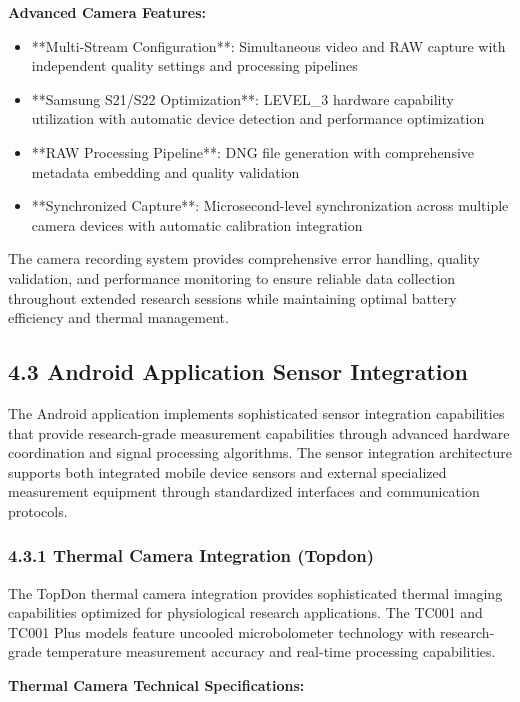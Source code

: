 \documentclass[12pt,a4paper]{article}
\begin{document}
\textbf{Advanced Camera Features:}

\begin{itemize}
\item **Multi-Stream Configuration**: Simultaneous video and RAW capture with independent quality settings and processing
  pipelines
\item **Samsung S21/S22 Optimization**: LEVEL_3 hardware capability utilization with automatic device detection and
  performance optimization
\item **RAW Processing Pipeline**: DNG file generation with comprehensive metadata embedding and quality validation
\item **Synchronized Capture**: Microsecond-level synchronization across multiple camera devices with automatic calibration
  integration

\end{itemize}
The camera recording system provides comprehensive error handling, quality validation, and performance monitoring to
ensure reliable data collection throughout extended research sessions while maintaining optimal battery efficiency and
thermal management.

\subsection{4.3 Android Application Sensor Integration}

The Android application implements sophisticated sensor integration capabilities that provide research-grade measurement
capabilities through advanced hardware coordination and signal processing algorithms. The sensor integration
architecture supports both integrated mobile device sensors and external specialized measurement equipment through
standardized interfaces and communication protocols.

\subsubsection{4.3.1 Thermal Camera Integration (Topdon)}

The TopDon thermal camera integration provides sophisticated thermal imaging capabilities optimized for physiological
research applications. The TC001 and TC001 Plus models feature uncooled microbolometer technology with research-grade
temperature measurement accuracy and real-time processing capabilities.

\textbf{Thermal Camera Technical Specifications:}
\end{document}
